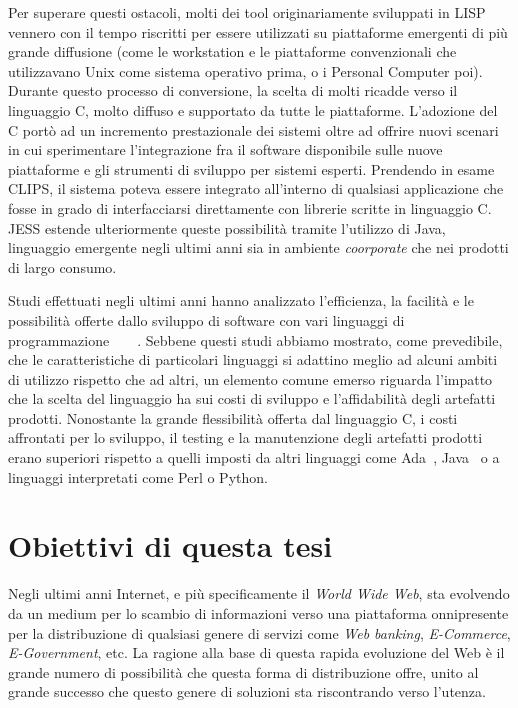 Per superare questi ostacoli, molti dei tool originariamente sviluppati in LISP vennero con il tempo riscritti per essere utilizzati su piattaforme emergenti di più grande diffusione (come le workstation e le piattaforme convenzionali che utilizzavano Unix come sistema operativo prima, o i Personal Computer poi).
Durante questo processo di conversione, la scelta di molti ricadde verso il linguaggio C, molto diffuso e supportato da tutte le piattaforme. L'adozione del C portò ad un incremento prestazionale dei sistemi oltre ad offrire nuovi scenari in cui sperimentare l'integrazione fra il software disponibile sulle nuove piattaforme e gli strumenti di sviluppo per sistemi esperti.
Prendendo in esame CLIPS, il sistema poteva essere integrato all'interno di qualsiasi applicazione che fosse in grado di interfacciarsi direttamente con librerie scritte in linguaggio C. JESS estende ulteriormente queste possibilità tramite l'utilizzo di Java, linguaggio emergente negli ultimi anni sia in ambiente \emph{coorporate} che nei prodotti di largo consumo.

Studi effettuati negli ultimi anni hanno analizzato l'efficienza, la facilità e le possibilità offerte dallo sviluppo di software con vari linguaggi di programmazione~\cite{naiditch1999}~\cite{Zeigler_95}~\cite{prechelt2000}~\cite{prashant2008}.
Sebbene questi studi abbiamo mostrato, come prevedibile, che le caratteristiche di particolari linguaggi si adattino meglio ad alcuni ambiti di utilizzo rispetto che ad altri, un elemento comune emerso riguarda l'impatto che la scelta del linguaggio ha sui costi di sviluppo e l'affidabilità degli artefatti prodotti. Nonostante la grande flessibilità offerta dal linguaggio C, i costi affrontati per lo sviluppo, il testing e la manutenzione degli artefatti prodotti erano superiori rispetto a quelli imposti da altri linguaggi come Ada~\cite{Zeigler_95}, Java~\cite{prashant2008} o a linguaggi interpretati come Perl o Python\cite{prechelt2000}.

\section{Obiettivi di questa tesi}
Negli ultimi anni Internet, e più specificamente il \emph{World Wide Web}, sta evolvendo da un medium per lo scambio di informazioni verso una piattaforma onnipresente per la distribuzione di qualsiasi genere di servizi come \emph{Web banking}, \emph{E-Commerce}, \emph{E-Government}, etc. La ragione alla base di questa rapida evoluzione del Web è il grande numero di possibilità che questa forma di distribuzione offre, unito al grande successo che questo genere di soluzioni sta riscontrando verso l'utenza.

